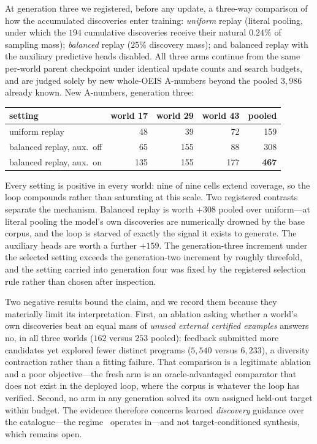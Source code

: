 \documentclass[11pt]{article}
\begin{document}
At generation three we registered, before any update, a three-way comparison of how the
accumulated discoveries enter training: \emph{uniform} replay (literal pooling, under which
the $194$ cumulative discoveries receive their natural $0.24\%$ of sampling mass);
\emph{balanced} replay ($25\%$ discovery mass); and balanced replay with the auxiliary
predictive heads disabled. All three arms continue from the same per-world parent
checkpoint under identical update counts and search budgets, and are judged solely by new
whole-OEIS A-numbers beyond the pooled $3{,}986$ already known. New A-numbers, generation
three:

\begin{center}
\begin{tabular}{lrrrr}
\toprule
setting & world 17 & world 29 & world 43 & pooled \\
\midrule
uniform replay & 48 & 39 & 72 & 159 \\
balanced replay, aux.\ off & 65 & 155 & 88 & 308 \\
balanced replay, aux.\ on & 135 & 155 & 177 & \textbf{467} \\
\bottomrule
\end{tabular}
\end{center}

Every setting is positive in every world: nine of nine cells extend coverage, so the loop
compounds rather than saturating at this scale. Two registered contrasts separate the
mechanism. Balanced replay is worth $+308$ pooled over uniform---at literal pooling the
model's own discoveries are numerically drowned by the base corpus, and the loop is starved
of exactly the signal it exists to generate. The auxiliary heads are worth a further $+159$.
The generation-three increment under the selected setting exceeds the generation-two
increment by roughly threefold, and the setting carried into generation four was fixed by
the registered selection rule rather than chosen after inspection.

Two negative results bound the claim, and we record them because they materially limit its
interpretation. First, an ablation asking whether a world's own discoveries beat an equal mass
of \emph{unused external certified examples} answers no, in all three worlds
($162$ versus $253$ pooled): feedback submitted more candidates yet explored fewer distinct
programs ($5{,}540$ versus $6{,}233$), a diversity contraction rather than a fitting
failure. That comparison is a legitimate ablation and a poor objective---the fresh arm is an
oracle-advantaged comparator that does not exist in the deployed loop, where the corpus is
whatever the loop has verified. Second, no arm in any generation solved its own assigned
held-out target within budget. The evidence therefore concerns learned \emph{discovery}
guidance over the catalogue---the regime~\cite{gauthier2023} operates in---and not
target-conditioned synthesis, which remains open.
\end{document}

